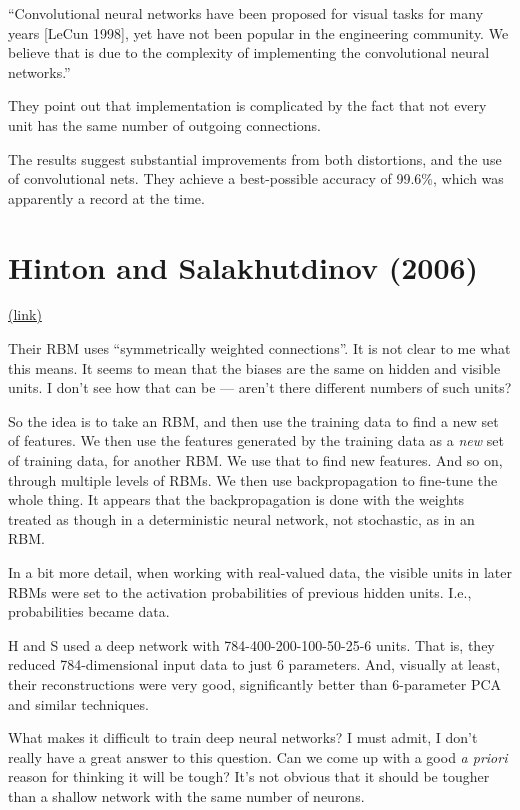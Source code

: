 \documentclass[12pt]{report}
\newcommand{\link}[2]{\href{#1}{#2}}
\begin{document}
``Convolutional neural networks have been proposed for visual tasks
for many years [LeCun 1998], yet have not been popular in the
engineering community.  We believe that is due to the complexity of
implementing the convolutional neural networks.''

They point out that implementation is complicated by the fact that not
every unit has the same number of outgoing connections.

The results suggest substantial improvements from both distortions,
and the use of convolutional nets.  They achieve a best-possible
accuracy of 99.6\%, which was apparently a record at the time.

\section{Hinton and Salakhutdinov (2006)}

\link{http://scholar.google.ca/scholar?cluster=15344645275208957628}{(link)}

Their RBM uses ``symmetrically weighted connections''.  It is not
clear to me what this means.  It seems to mean that the biases are the
same on hidden and visible units.  I don't see how that can be ---
aren't there different numbers of such units?

So the idea is to take an RBM, and then use the training data to find
a new set of features.  We then use the features generated by the
training data as a \emph{new} set of training data, for another RBM.
We use that to find new features.  And so on, through multiple levels
of RBMs.  We then use backpropagation to fine-tune the whole thing.
It appears that the backpropagation is done with the weights treated
as though in a deterministic neural network, not stochastic, as in an
RBM.

In a bit more detail, when working with real-valued data, the visible
units in later RBMs were set to the activation probabilities of
previous hidden units.  I.e., probabilities became data.

H and S used a deep network with 784-400-200-100-50-25-6 units.  That
is, they reduced 784-dimensional input data to just 6 parameters.
And, visually at least, their reconstructions were very good,
significantly better than 6-parameter PCA and similar techniques.

What makes it difficult to train deep neural networks?  I must admit,
I don't really have a great answer to this question.  Can we come up
with a good \emph{a priori} reason for thinking it will be tough?
It's not obvious that it should be tougher than a shallow network with
the same number of neurons.
\end{document}
